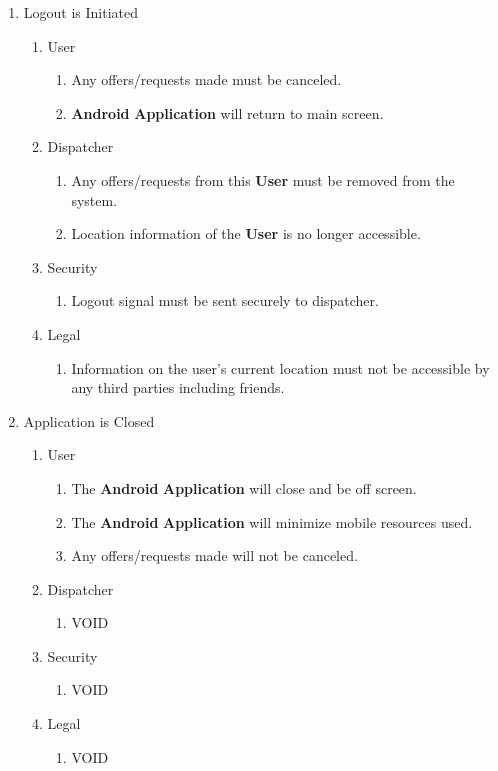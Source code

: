 \documentclass[english]{article}
\begin{document}
\begin{enumerate}[{BE}1.]
	\item Logout is Initiated
	\begin{enumerate}[{VP11}.1]
		\item User
			\begin{enumerate}
				\item Any offers/requests made must be canceled.
				\item  \textbf{Android} \textbf{Application} will return to main screen.
			\end{enumerate}
		\item Dispatcher
			\begin{enumerate}
				\item Any offers/requests from this \textbf{User} must be removed from the system.
				\item Location information of the \textbf{User} is no longer accessible.
			\end{enumerate}
		\item Security
			\begin{enumerate}
				\item Logout signal must be sent securely to dispatcher.
			\end{enumerate}
		\item Legal
			\begin{enumerate}
				\item Information on the user's current location must not be accessible by any third parties including friends.
			\end{enumerate}
	\end{enumerate}

	\item Application is Closed
	\begin{enumerate}[{VP12}.1]
		\item User
			\begin{enumerate}
				\item The  \textbf{Android} \textbf{Application} will close and be off screen.
				\item The  \textbf{Android} \textbf{Application} will minimize mobile resources used.
				\item Any offers/requests made will not be canceled.
			\end{enumerate}
		\item Dispatcher
			\begin{enumerate}
				\item VOID
			\end{enumerate}
		\item Security
			\begin{enumerate}
				\item VOID
			\end{enumerate}
		\item Legal
			\begin{enumerate}
				\item VOID
			\end{enumerate}
	\end{enumerate}

\end{enumerate}
\end{document}
